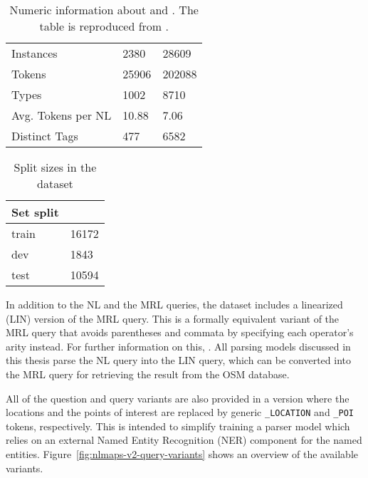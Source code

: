 \begin{table}[ht!]
  \centering
  \begin{tabular}[h]{lll}
    \toprule
    & \nlmapsone{} & \nlmapstwo{}\\
    \midrule
    Instances & \num{2380} & \num{28609}\\
    Tokens & \num{25906} & \num{202088}\\
    Types & \num{1002} & \num{8710}\\
    Avg. Tokens per NL & \num{10.88} & \num{7.06}\\
    Distinct Tags & \num{477} & \num{6582}\\
    \bottomrule
  \end{tabular}
  \caption[\nlmapstwo{} statistics]{Numeric information about \nlmapsone{} and
    \nlmapstwo{}. The table is reproduced from \textcite{lawrence-2018}.}
  \label{tab:nlmaps-v1-v2-stats}
\end{table}

\begin{table}[ht!]
  \centering
  \begin{tabular}[h]{ll}
    \toprule
    Set split & \nlmapstwo{}\\
    \midrule
    train & \num{16172}\\
    dev & \num{1843}\\
    test & \num{10594}\\
    \bottomrule
  \end{tabular}
  \caption[\nlmapstwo{} splits]{Split sizes in the \nlmapstwo{} dataset}
  \label{tab:nlmapsv2-splits}
\end{table}

In addition to the NL and the MRL queries, the dataset includes a linearized
(LIN) version of the MRL query. This is a formally equivalent variant of the MRL
query that avoids parentheses and commata by specifying each operator’s arity
instead. For further information on this,
\textcites(cf.)(){andreas-2013}{haas-2016}. All parsing models discussed in this
thesis parse the NL query into the LIN query, which can be converted into the
MRL query for retrieving the result from the OSM database.

All of the question and query variants are also provided in a version where the
locations and the points of interest are replaced by generic
\lstinline!_LOCATION! and \lstinline!_POI! tokens, respectively. This is
intended to simplify training a parser model which relies on an external Named
Entity Recognition (NER) component for the named entities.
Figure~\ref{fig:nlmaps-v2-query-variants} shows an overview of the available
variants.

